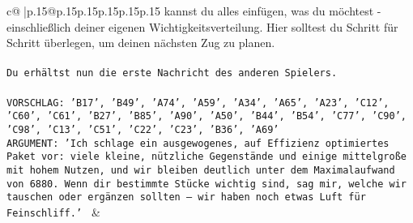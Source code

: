 \documentclass{article}
\begin{document}
{\begin{supertabular}{c@{$\;$}|p{.15\linewidth}@{}p{.15\linewidth}p{.15\linewidth}p{.15\linewidth}p{.15\linewidth}p{.15\linewidth}}
{{{kannst du alles einfügen, was du möchtest - einschließlich deiner eigenen Wichtigkeitsverteilung. Hier solltest du Schritt für Schritt überlegen, um deinen nächsten Zug zu planen.\\ \tt \\ \tt Du erhältst nun die erste Nachricht des anderen Spielers.\\ \tt \\ \tt VORSCHLAG: {'B17', 'B49', 'A74', 'A59', 'A34', 'A65', 'A23', 'C12', 'C60', 'C61', 'B27', 'B85', 'A90', 'A50', 'B44', 'B54', 'C77', 'C90', 'C98', 'C13', 'C51', 'C22', 'C23', 'B36', 'A69'}\\ \tt ARGUMENT: {'Ich schlage ein ausgewogenes, auf Effizienz optimiertes Paket vor: viele kleine, nützliche Gegenstände und einige mittelgroße mit hohem Nutzen, und wir bleiben deutlich unter dem Maximalaufwand von 6880. Wenn dir bestimmte Stücke wichtig sind, sag mir, welche wir tauschen oder ergänzen sollten – wir haben noch etwas Luft für Feinschliff.'} 
	  } 
	   } 
	   } 
	 & \\ 
 

    \theutterance {}  


\end{supertabular}}
\end{document}
